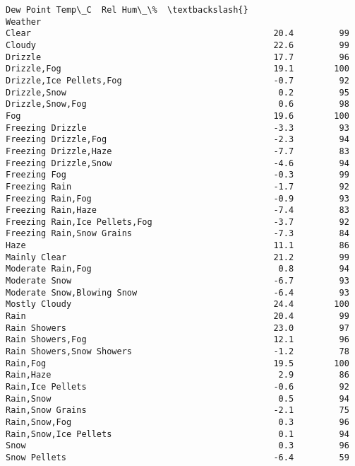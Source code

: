 \documentclass[11pt]{article}
\begin{document}
\begin{tcolorbox}[breakable, size=fbox, boxrule=.5pt, pad at break*=1mm, opacityfill=0]
\begin{Verbatim}[commandchars=\\\{\}]
                                         Dew Point Temp\_C  Rel Hum\_\%  \textbackslash{}
Weather
Clear                                                20.4         99
Cloudy                                               22.6         99
Drizzle                                              17.7         96
Drizzle,Fog                                          19.1        100
Drizzle,Ice Pellets,Fog                              -0.7         92
Drizzle,Snow                                          0.2         95
Drizzle,Snow,Fog                                      0.6         98
Fog                                                  19.6        100
Freezing Drizzle                                     -3.3         93
Freezing Drizzle,Fog                                 -2.3         94
Freezing Drizzle,Haze                                -7.7         83
Freezing Drizzle,Snow                                -4.6         94
Freezing Fog                                         -0.3         99
Freezing Rain                                        -1.7         92
Freezing Rain,Fog                                    -0.9         93
Freezing Rain,Haze                                   -7.4         83
Freezing Rain,Ice Pellets,Fog                        -3.7         92
Freezing Rain,Snow Grains                            -7.3         84
Haze                                                 11.1         86
Mainly Clear                                         21.2         99
Moderate Rain,Fog                                     0.8         94
Moderate Snow                                        -6.7         93
Moderate Snow,Blowing Snow                           -6.4         93
Mostly Cloudy                                        24.4        100
Rain                                                 20.4         99
Rain Showers                                         23.0         97
Rain Showers,Fog                                     12.1         96
Rain Showers,Snow Showers                            -1.2         78
Rain,Fog                                             19.5        100
Rain,Haze                                             2.9         86
Rain,Ice Pellets                                     -0.6         92
Rain,Snow                                             0.5         94
Rain,Snow Grains                                     -2.1         75
Rain,Snow,Fog                                         0.3         96
Rain,Snow,Ice Pellets                                 0.1         94
Snow                                                  0.3         96
Snow Pellets                                         -6.4         59

\end{Verbatim}
\end{tcolorbox}
\end{document}
